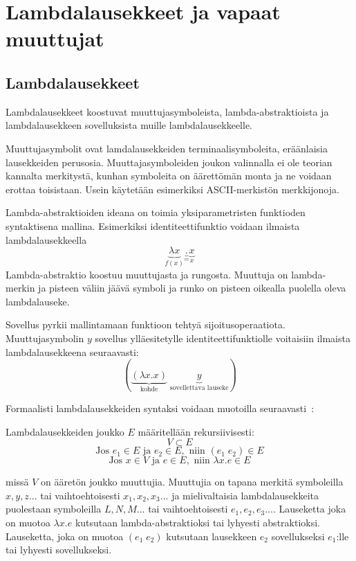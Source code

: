 \section{Lambdalausekkeet ja vapaat muuttujat}

\subsection{Lambdalausekkeet}

Lambdalausekkeet koostuvat muuttujasymboleista, lambda-abstraktioista ja lambdalausekkeen sovelluksista muille lambdalausekkeelle.
\par 
Muuttujasymbolit ovat lamdalausekkeiden terminaalisymboleita, eräänlaisia lausekkeiden perusosia. Muuttajasymboleiden joukon valinnalla ei ole teorian kannalta merkitystä, kunhan symboleita on äärettömän monta ja ne voidaan erottaa toisistaan. Usein käytetään esimerkiksi ASCII-merkistön merkkijonoja.
\par
Lambda-abstraktioiden ideana on toimia yksiparametristen funktioden syntaktisena mallina. Esimerkiksi identiteettifunktio voidaan ilmaista lambdalausekkeella 
\[ \underbrace{ \lambda x }_{ f(x) } \underbrace{ . }_{ = }  \underbrace{ x }_{x} \]
Lambda-abstraktio koostuu muuttujasta ja rungosta. Muuttuja on lambda-merkin ja pisteen väliin jäävä symboli ja runko on pisteen oikealla puolella oleva lambdalauseke. 
\par
Sovellus pyrkii mallintamaan funktioon tehtyä sijoitusoperaatiota. Muuttujasymbolin $y$ sovellus ylläesitetylle identiteettifunktiolle voitaisiin ilmaista lambdalausekkeena seuraavasti:
\[ ( \underbrace{ (\lambda x . x ) }_{ \text{kohde} } \; \underbrace{ y }_{ \text{sovellettava lauseke} } ) \]
\par
Formaalisti lambdalausekkeiden syntaksi voidaan muotoilla seuraavasti~\cite[s.~8]{Hudak89}:
\pagebreak
\begin{maar}[lambdalausekkeet]
Lambdalausekkeiden joukko $E$ määritellään rekursiivisesti: 
\[ V \subset E \]
\[ \text{Jos } e_{1} \in E \text{ ja } e_{2} \in E, \text{ niin }  (e_{1} \; e_{2}) \in E \]
\[ \text{Jos } x \in V \text{ ja } e \in E, \text{ niin } \lambda x.e \in E \]

missä $V$ on ääretön joukko muuttujia. Muuttujia on tapana merkitä symboleilla $x, y,z...$ tai vaihtoehtoisesti $x_{1}, x_{2}, x_{3}...$ ja mielivaltaisia lambdalausekkeita puolestaan symboleilla $L, N, M ...$ tai vaihtoehtoisesti $e_{1}, e_{2}, e_{3}...$.  Lauseketta joka on muotoa $\lambda x.e$ kutsutaan lambda-abstraktioksi tai lyhyesti abstraktioksi. Lauseketta, joka on muotoa $(e_{1} \; e_{2})$ kutsutaan lausekkeen $e_{2}$ sovellukseksi $e_{1}$:lle tai lyhyesti sovellukseksi.
\end{maar}

